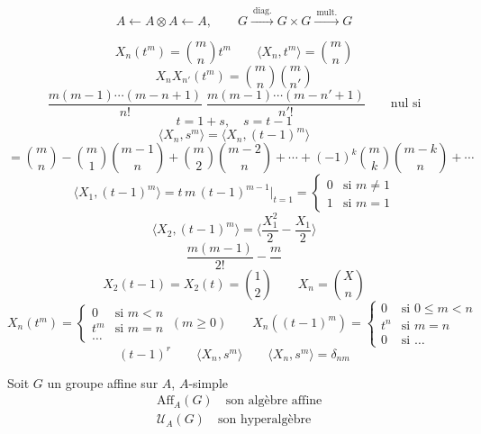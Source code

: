 \documentclass[11pt,a4paper]{article}
\begin{document}
\[
A \longleftarrow A \otimes A \longleftarrow A, \qquad
G \xrightarrow{\ \text{diag.}\ } G \times G \xrightarrow{\ \text{mult.}\ } G
\]


\[
X_n(t^m) = \binom{m}{n} t^m \qquad
\langle X_n, t^m \rangle = \binom{m}{n}
\]
\[
X_n X_{n'}(t^m) = \binom{m}{n}\binom{m}{n'}
\]
\[
\frac{m(m-1)\cdots(m-n+1)}{n!}\;\frac{m(m-1)\cdots(m-n'+1)}{n'!}
\qquad \text{nul si}
\]
\[
t = 1 + s, \quad s = t - 1
\]
\[
\langle X_n, s^m \rangle = \langle X_n, (t-1)^m \rangle
\]
\[
= \binom{m}{n} - \binom{m}{1}\binom{m-1}{n} + \binom{m}{2}\binom{m-2}{n}
+ \cdots + (-1)^k \binom{m}{k}\binom{m-k}{n} + \cdots
\]
\[
\langle X_1, (t-1)^m \rangle = t\,m\,(t-1)^{m-1}\big|_{t=1}
= \left\lbrace
\begin{array}{ll}
0 & \text{si } m \neq 1 \\
1 & \text{si } m = 1
\end{array}
\right.
\]
\[
\langle X_2, (t-1)^m \rangle = \Big\langle \frac{X_1^2}{2} - \frac{X_1}{2} \Big\rangle
\]
\[
\frac{m(m-1)}{2!} - \frac{m}{\ \ }
\]
\[
X_2(t-1) = X_2(t) = \binom{1}{2}
\qquad X_n = \binom{X}{n}
\]
\[
X_n(t^m) = \left\lbrace
\begin{array}{ll}
0 & \text{si } m < n \\
t^m & \text{si } m = n \\
\ldots &
\end{array}
\right. \ (m \geq 0)
\qquad
X_n((t-1)^m) = \left\lbrace
\begin{array}{ll}
0 & \text{si } 0 \leq m < n \\
t^n & \text{si } m = n \\
0 & \text{si } \ldots
\end{array}
\right.
\]
\[
(t-1)^r \qquad \langle X_n, s^m \rangle \qquad
\langle X_n, s^m \rangle = \delta_{nm}
\]


Soit $G$ un  groupe affine sur $A$, $A$-simple
\begin{align*}
&\mathrm{Aff}_A(G) \quad \text{son algèbre affine} \\
&\mathcal{U}_A(G) \quad \text{son hyperalgèbre}
\end{align*}
\end{document}
